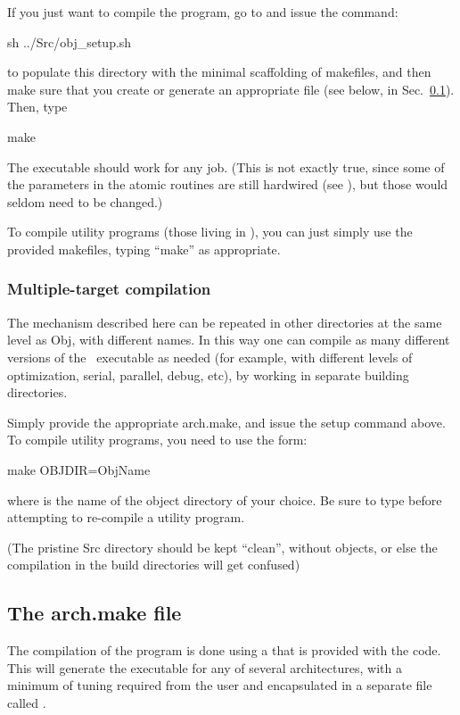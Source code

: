 If you just want to compile the program, go to  and issue the
command:
\begin{shellexample}
  sh ../Src/obj_setup.sh
\end{shellexample}
to populate this directory with the minimal scaffolding of makefiles,
and then make sure that you create or generate an appropriate 
file (see below, in Sec.~\ref{sec:arch-make}). Then, type
\begin{shellexample}
  make
\end{shellexample}
The executable should work for any job. (This is not exactly true,
since some of the parameters in the atomic routines are still
hardwired (see ), but those would seldom need to
be changed.)

To compile utility programs (those living in ), you can just
simply use the provided makefiles, typing ``make'' as appropriate.

\subsubsection{Multiple-target compilation}

The mechanism described here can be repeated in other directories at
the same level as Obj, with different names. In this way one can
compile as many different versions of the \siesta\ executable as
needed (for example, with different levels of optimization, serial,
parallel, debug, etc), by working in separate building directories.

Simply provide the appropriate arch.make, and issue the setup command
above. To compile utility programs, you need to use the form:
\begin{shellexample}
   make OBJDIR=ObjName
\end{shellexample}
where  is the name of the object directory of your
choice. Be sure to type  before attempting to
re-compile a utility program.

(The pristine Src directory should be kept ``clean'', without objects, or else
the compilation in the build directories will get confused)


\subsection{The arch.make file}
\label{sec:arch-make}

The compilation of the program is done using a  that is
provided with the code. This  will
generate the executable for any of several architectures, with a
minimum of tuning required from the user and encapsulated in a
separate file called .

